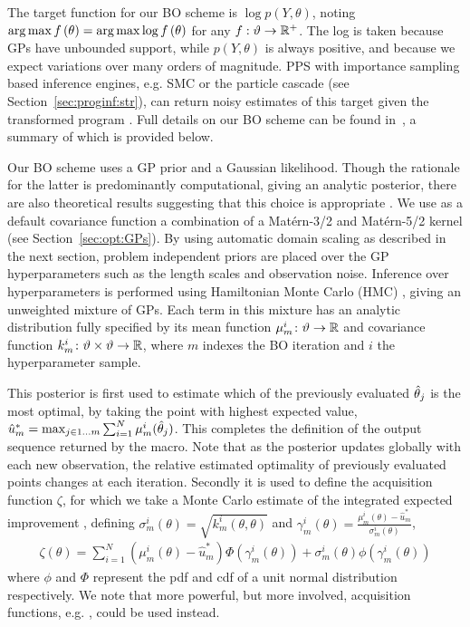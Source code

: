 
The target function for our BO scheme is $\log p(Y,\theta)$, noting $\operatorname*{arg\,max} f\left(\theta\right) = \operatorname*{arg\,max} \log f\left(\theta\right)$ for any $f : \vartheta \rightarrow \mathbb{R}^+$.  The log is taken because GPs have unbounded support, while $p\left(Y,\theta\right)$ is always positive, and because we expect variations over many orders of magnitude.  PPS with importance sampling based inference engines, e.g. SMC or the particle cascade (see Section~\ref{sec:proginf:str}), can return noisy estimates of this target given the transformed program \qmarg.   Full details on our BO scheme can be found
in~\cite{rainforth2017boppArxiv}, a summary of which is provided below.

Our BO scheme uses a GP prior and a Gaussian likelihood.  Though the rationale for the latter is predominantly computational, giving an analytic posterior, there are also theoretical results suggesting that this choice is appropriate \cite{berard2014lognormal}. We use as a default covariance function a combination of a Mat\'{e}rn-3/2 and Mat\'{e}rn-5/2 kernel (see
Section~\ref{sec:opt:GPs}). By using automatic domain scaling as described in the next section, problem independent priors are placed over the GP hyperparameters such as the length scales and observation noise.  Inference over hyperparameters is performed using Hamiltonian Monte Carlo (HMC) \citep{duane1987hybrid}, giving an unweighted mixture of GPs.  Each term in this mixture has an analytic distribution fully specified by its mean function $\mu_m^i \colon \vartheta \rightarrow \mathbb{R}$ and covariance function $k_m^i \colon \vartheta \times \vartheta \rightarrow \mathbb{R}$, where $m$ indexes the BO iteration and $i$ the hyperparameter sample.

This posterior is first used to estimate which of the previously evaluated $\hat{\theta}_j$ is the most optimal, by taking the point with highest expected value, $\hat{u}^*_m = \max_{j\in1\dots m} \sum_{i=1}^{N} \mu_{m}^i (\hat{\theta}_j)$.  This completes the definition of the output sequence returned by the \doopt macro.  Note that as the posterior updates globally with each new observation, the relative estimated optimality of previously evaluated points changes at each iteration.
Secondly it is used to define the acquisition function $\zeta$, for which we take a Monte Carlo estimate of the integrated expected improvement \cite{snoek2012practical}, defining $\sigma_m^i\left(\theta\right) = \sqrt{k_m^i\left(\theta,\theta\right)}$ and $\gamma_m^i\left(\theta\right) = \frac{\mu_m^i \left(\theta\right)-\hat{u}_m^*}{\sigma_m^i\left(\theta\right)}$,
\begin{align}
\label{eq:exp-imp}
\zeta \left(\theta\right) = \sum_{i=1}^{N} \left(\mu_m^i\left(\theta\right)-\hat{u}_m^*\right)\Phi \left(\gamma_m^i\left(\theta\right)\right)+\sigma_m^i\left(\theta\right)\phi\left(\gamma_m^i\left(\theta\right)\right)
\end{align}
where $\phi$ and $\Phi$ represent the pdf and cdf of a unit normal distribution respectively.   We note that more powerful, but more involved, acquisition functions, e.g. \cite{hernandez2014predictive}, could be used instead.

